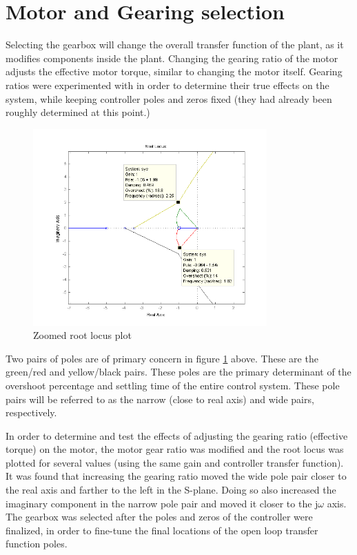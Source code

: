 \section{Motor and Gearing selection}

Selecting the gearbox will change the overall transfer function of the plant, as it modifies components inside the plant. Changing the gearing ratio of the motor adjusts the effective motor torque, similar to changing the motor itself. Gearing ratios were experimented with in order to determine their true effects on the system, while keeping controller poles and zeros fixed (they had already been roughly determined at this point.)

\begin{figure}[ht]
	\centering
		\includegraphics[width=0.80\textwidth]{pics/rlocus}
	\caption{Zoomed root locus plot}
	\label{2:fig:rlocus}
\end{figure}

Two pairs of poles are of primary concern in figure \ref{2:fig:rlocus} above. These are the green/red and yellow/black pairs. These poles are the primary determinant of the overshoot percentage and settling time of the entire control system. These pole pairs will be referred to as the narrow (close to real axis) and wide pairs, respectively.

In order to determine and test the effects of adjusting the gearing ratio (effective torque) on the motor, the motor gear ratio was modified and the root locus was plotted for several values (using the same gain and controller transfer function). It was found that increasing the gearing ratio moved the wide pole pair closer to the real axis and farther to the left in the S-plane. Doing so also increased the imaginary component in the narrow pole pair and moved it closer to the j$\omega$ axis. The gearbox was selected after the poles and zeros of the controller were finalized, in order to fine-tune the final locations of the open loop transfer function poles.

